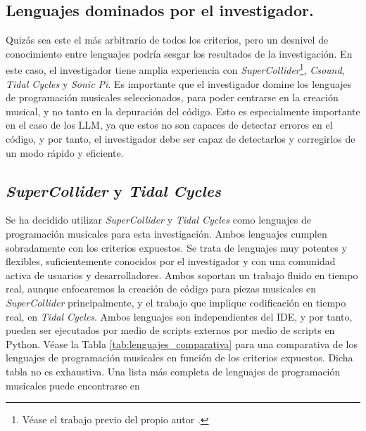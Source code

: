\subsection{Lenguajes dominados por el investigador.} 
Quizás sea este el más arbitrario de todos los criterios, pero un desnivel de conocimiento entre lenguajes podría sesgar los resultados de la investigación. En este caso, el investigador tiene amplia experiencia con \textit{SuperCollider}\footnote{Véase el trabajo previo del propio autor \citep{guerraparraMesjetiuTFM_Arte_Sonoro_MEMORIA2020}.}, \textit{Csound}, \textit{Tidal Cycles} y \textit{Sonic Pi}.
Es importante que el investigador domine los lenguajes de programación musicales seleccionados, para poder centrarse en la creación musical, y no tanto en la depuración del código. Esto es especialmente importante en el caso de los LLM, ya que estos no son capaces de detectar errores en el código, y por tanto, el investigador debe ser capaz de detectarlos y corregirlos de un modo rápido y eficiente.

\subsection{\textit{SuperCollider} y \textit{Tidal Cycles}}
Se ha decidido utilizar \textit{SuperCollider} y \textit{Tidal Cycles} como lenguajes de programación musicales para esta investigación. Ambos lenguajes cumplen sobradamente con los criterios expuestos. Se trata de lenguajes muy potentes y flexibles, suficientemente conocidos por el investigador y con una comunidad activa de usuarios y desarrolladores. Ambos soportan un trabajo fluido en tiempo real, aunque enfocaremos la creación de código para piezas musicales en \textit{SuperCollider} principalmente, y el trabajo que implique codificación en tiempo real, en \textit{Tidal Cycles}. Ambos lenguajes son independientes del IDE, y por tanto, pueden ser ejecutados por medio de scripts externos por medio de scripts en Python. Véase la Tabla \ref{tab:lenguajes_comparativa} para una comparativa de los lenguajes de programación musicales en función de los criterios expuestos. Dicha tabla no es exhaustiva. Una lista más completa de lenguajes de programación musicales puede encontrarse en \cite{ListAudioProgramming2023}

